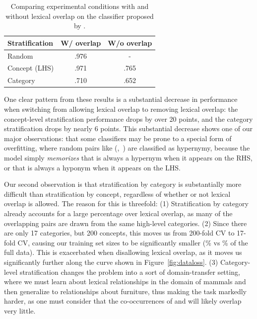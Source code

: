 \begin{table}
  \centering
  \begin{tabular}{|l|c|c|}
      \hline
      {\bf Stratification} & {\bf W/ overlap} & {\bf W/o overlap} \\
      \hline
      \hline
      Random               &   .976           &     -             \\
      Concept (LHS)        &   .971           &   .765            \\
      Category             &   .710           &   .652            \\
      \hline
  \end{tabular}
  \caption{Comparing experimental conditions with and without lexical overlap
    on the classifier proposed by .}
  \label{tab:overlapresults}
\end{table}

One clear pattern from these results is a substantial
decrease in performance when switching from allowing lexical overlap to
removing lexical overlap: the concept-level stratification performance drops
by over 20 points, and the category stratification drops by nearly 6 points.
This substantial decrease shows one of our major observations: that some
classifiers may be prone to a special form of overfitting, where random pairs
like (,~) are classified as hypernymy, because the
model simply {\em memorizes} that  is always a hypernym when it
appears on the RHS, or that  is always a hyponym when it appears
on the LHS.

Our second observation is that stratification by category is substantially
more difficult than stratification by concept, regardless of whether or
not lexical overlap is allowed. The reason for this is threefold:
(1) Stratification by category already accounts for a large percentage over
lexical overlap, as many of the overlapping pairs are drawn from the same
high-level categories. (2) Since there are only 17 categories, but 200 concepts,
this moves us from 200-fold CV to 17-fold CV, causing our training set sizes
to be significantly smaller (\% vs \% of the full
data). This is exacerbated when disallowing lexical overlap, as it moves us
significantly further along the curve shown in Figure~\ref{fig:dataloss}.
(3) Category-level stratification changes the problem into a sort of
domain-transfer setting, where we must learn about lexical relationships in
the domain of mammals and then generalize to relationships about
furniture, thus making the task markedly harder, as one must consider
that the co-occurrences of  and  will likely overlap
very little.

